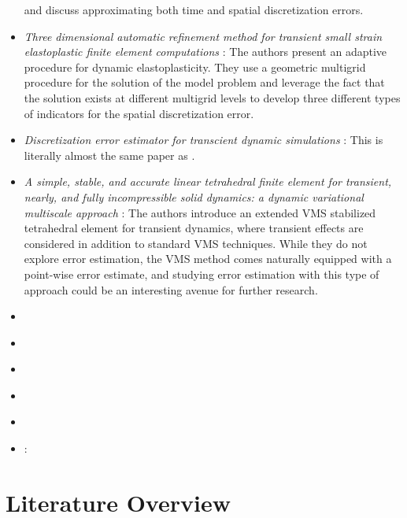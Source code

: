 \documentclass{article}
\begin{document}
\begin{itemize}
and discuss approximating both time and spatial discretization errors.
\item
\emph{Three dimensional automatic refinement method for transient small
strain elastoplastic finite element computations} \cite{biotteau2012three}:
The authors present an adaptive procedure for dynamic elastoplasticity.
They use a geometric multigrid procedure for the solution of the
model problem and leverage the fact that the solution exists at different
multigrid levels to develop three different types of indicators
for the spatial discretization error.
\item
\emph{Discretization error estimator for transcient dynamic simulations}
\cite{combe2002discretization}: This is literally almost the same
paper as \cite{ladeveze2003estimation}.
\item
\emph{A simple, stable, and accurate linear tetrahedral finite element for
transient, nearly, and fully incompressible solid dynamics: a dynamic
variational multiscale approach} \cite{scovazzi2016simple}: The
authors introduce an extended VMS stabilized tetrahedral element for
transient dynamics, where transient effects are considered in addition
to standard VMS techniques. While they do not explore error estimation,
the VMS method comes naturally equipped with a point-wise error estimate,
and studying error estimation with this type of approach could be
an interesting avenue for further research.
\item \cite{molinari2002three}
\item \cite{luo2009adaptive}
\item \cite{lahiri2010variationally}
\item \cite{masud2013framework}
\item \cite{radovitzky1999error}
\item \cite{rodríguez2000error}:
\end{itemize}

\section{Literature Overview}



\end{document}

